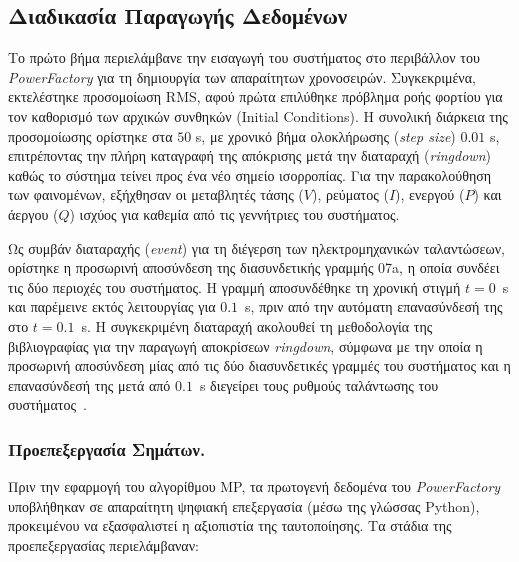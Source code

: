 \subsection{Διαδικασία Παραγωγής Δεδομένων}
\ifkundursystemanalysis

Το πρώτο βήμα περιελάμβανε την εισαγωγή του συστήματος στο περιβάλλον του \textenglish{\textit{PowerFactory}} για τη δημιουργία των απαραίτητων χρονοσειρών. Συγκεκριμένα, εκτελέστηκε προσομοίωση \textenglish{RMS}, αφού πρώτα επιλύθηκε πρόβλημα ροής φορτίου για τον καθορισμό των αρχικών συνθηκών \textenglish{(Initial Conditions)}. Η συνολική διάρκεια της προσομοίωσης ορίστηκε στα $50$ s, με χρονικό βήμα ολοκλήρωσης (\textenglish{\textit{step size}}) $0.01$ s, επιτρέποντας την πλήρη καταγραφή της απόκρισης μετά την διαταραχή (\textenglish{\textit{ringdown}}) καθώς το σύστημα τείνει προς ένα νέο σημείο ισορροπίας. Για την παρακολούθηση των φαινομένων, εξήχθησαν οι μεταβλητές τάσης ($V$), ρεύματος ($I$), ενεργού ($P$) και άεργου ($Q$) ισχύος για καθεμία από τις γεννήτριες του συστήματος.

Ως συμβάν διαταραχής (\textenglish{\textit{event}}) για τη διέγερση των ηλεκτρομηχανικών ταλαντώσεων, ορίστηκε η προσωρινή αποσύνδεση της διασυνδετικής γραμμής \textenglish{07a}, η οποία συνδέει τις δύο περιοχές του συστήματος. Η γραμμή αποσυνδέθηκε τη χρονική στιγμή $t=0$~s και παρέμεινε εκτός λειτουργίας για $0.1$~s, πριν από την αυτόματη επανασύνδεσή της στο $t=0.1$~s. Η συγκεκριμένη διαταραχή ακολουθεί τη μεθοδολογία της βιβλιογραφίας για την παραγωγή αποκρίσεων \textenglish{\textit{ringdown}}, σύμφωνα με την οποία η προσωρινή αποσύνδεση μίας από τις δύο διασυνδετικές γραμμές του συστήματος και η επανασύνδεσή της μετά από $0.1$~s διεγείρει τους ρυθμούς ταλάντωσης του συστήματος~\cite{estimation2021}.

\subsubsection{Προεπεξεργασία Σημάτων.}
Πριν την εφαρμογή του αλγορίθμου MP, τα πρωτογενή δεδομένα του \textenglish{\textit{PowerFactory}} υποβλήθηκαν σε απαραίτητη ψηφιακή επεξεργασία (μέσω της γλώσσας Python), προκειμένου να εξασφαλιστεί η αξιοπιστία της ταυτοποίησης. Τα στάδια της προεπεξεργασίας περιελάμβαναν:

